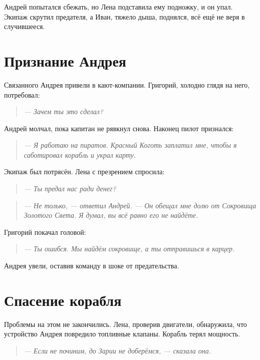 \documentclass[12pt,a4paper]{book}
\newenvironment{dialogue}{\begin{quote}\itshape}{\end{quote}} %
\begin{document}
Андрей попытался сбежать, но Лена подставила ему подножку, и он упал. Экипаж скрутил предателя, а Иван, тяжело дыша, поднялся, всё ещё не веря в случившееся.

\section*{Признание Андрея}

Связанного Андрея привели в кают-компании. Григорий, холодно глядя на него, потребовал:

\begin{dialogue}
--- Зачем ты это сделал?
\end{dialogue}

Андрей молчал, пока капитан не рявкнул снова. Наконец пилот признался:

\begin{dialogue}
--- Я работаю на пиратов. Красный Коготь заплатил мне, чтобы я саботировал корабль и украл карту.
\end{dialogue}

Экипаж был потрясён. Лена с презрением спросила:

\begin{dialogue}
--- Ты предал нас ради денег?
\end{dialogue}

\begin{dialogue}
--- Не только, --- ответил Андрей. --- Он обещал мне долю от Сокровища Золотого Света. Я думал, вы всё равно его не найдёте.
\end{dialogue}

Григорий покачал головой:

\begin{dialogue}
--- Ты ошибся. Мы найдём сокровище, а ты отправишься в карцер.
\end{dialogue}

Андрея увели, оставив команду в шоке от предательства.

\section*{Спасение корабля}

Проблемы на этом не закончились. Лена, проверив двигатели, обнаружила, что устройство Андрея повредило топливные клапаны. Корабль терял мощность.

\begin{dialogue}
--- Если не починим, до Зарии не доберёмся, --- сказала она.
\end{dialogue}
\end{document}

